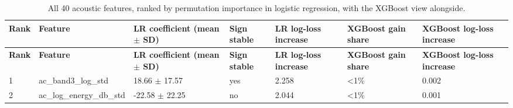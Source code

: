 \documentclass[11pt,a4paper]{article}
\begin{document}
\begin{center}\small\renewcommand{\arraystretch}{1.15}
\begin{longtable}{>{\raggedright\arraybackslash}p{0.76cm}>{\raggedright\arraybackslash}p{3.82cm}>{\raggedright\arraybackslash}p{2.77cm}>{\raggedleft\arraybackslash}p{1.55cm}>{\raggedleft\arraybackslash}p{1.55cm}>{\raggedleft\arraybackslash}p{1.55cm}>{\raggedleft\arraybackslash}p{1.55cm}}
\caption{All 40 acoustic features, ranked by permutation importance in logistic regression, with the XGBoost view alongside.}\\
\toprule
\textbf{\hspace{0pt}Rank} & \textbf{\hspace{0pt}Feature} & \textbf{\hspace{0pt}LR coefficient (mean $\pm$ SD)} & \textbf{\hspace{0pt}Sign stable} & \textbf{\hspace{0pt}LR log-loss increase} & \textbf{\hspace{0pt}XGBoost gain share} & \textbf{\hspace{0pt}XGBoost log-loss increase}\\\midrule\endfirsthead
\toprule
\textbf{\hspace{0pt}Rank} & \textbf{\hspace{0pt}Feature} & \textbf{\hspace{0pt}LR coefficient (mean $\pm$ SD)} & \textbf{\hspace{0pt}Sign stable} & \textbf{\hspace{0pt}LR log-loss increase} & \textbf{\hspace{0pt}XGBoost gain share} & \textbf{\hspace{0pt}XGBoost log-loss increase}\\\midrule\endhead
\bottomrule\endfoot
\hspace{0pt}1 & \hspace{0pt}ac\_\allowbreak{}band3\_\allowbreak{}log\_\allowbreak{}std & \hspace{0pt}18.66 $\pm$ 17.57 & \hspace{0pt}yes & \hspace{0pt}2.258 & \hspace{0pt}<1\% & \hspace{0pt}0.002\\
\hspace{0pt}2 & \hspace{0pt}ac\_\allowbreak{}log\_\allowbreak{}energy\_\allowbreak{}db\_\allowbreak{}std & \hspace{0pt}-22.58 $\pm$ 22.25 & \hspace{0pt}no & \hspace{0pt}2.044 & \hspace{0pt}<1\% & \hspace{0pt}0.001\\

\end{longtable}
\end{center}
\end{document}
